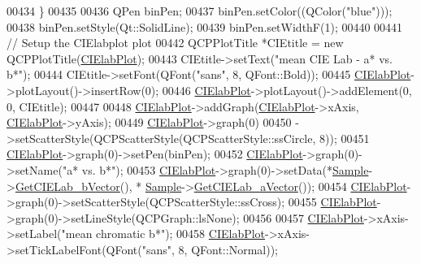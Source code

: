 \begin{DoxyCode}
{{00434     \}
00435 
00436   QPen binPen;
00437   binPen.setColor((QColor(\textcolor{stringliteral}{"blue"})));
00438   binPen.setStyle(Qt::SolidLine);
00439   binPen.setWidthF(1);
00440 
00441   \textcolor{comment}{// Setup the CIElabplot plot}
00442   QCPPlotTitle *CIEtitle = \textcolor{keyword}{new} QCPPlotTitle(\hyperlink{class_q_report_generator_a1a727308ea8cb98523a308d10da70b39}{CIElabPlot});
00443   CIEtitle->setText(\textcolor{stringliteral}{"mean CIE Lab - a* vs. b*"});
00444   CIEtitle->setFont(QFont(\textcolor{stringliteral}{"sans"}, 8, QFont::Bold));
00445   \hyperlink{class_q_report_generator_a1a727308ea8cb98523a308d10da70b39}{CIElabPlot}->plotLayout()->insertRow(0);
00446   \hyperlink{class_q_report_generator_a1a727308ea8cb98523a308d10da70b39}{CIElabPlot}->plotLayout()->addElement(0, 0, CIEtitle);
00447 
00448   \hyperlink{class_q_report_generator_a1a727308ea8cb98523a308d10da70b39}{CIElabPlot}->addGraph(\hyperlink{class_q_report_generator_a1a727308ea8cb98523a308d10da70b39}{CIElabPlot}->xAxis, \hyperlink{class_q_report_generator_a1a727308ea8cb98523a308d10da70b39}{CIElabPlot}->yAxis);
00449   \hyperlink{class_q_report_generator_a1a727308ea8cb98523a308d10da70b39}{CIElabPlot}->graph(0)
00450       ->setScatterStyle(QCPScatterStyle(QCPScatterStyle::ssCircle, 8));
00451   \hyperlink{class_q_report_generator_a1a727308ea8cb98523a308d10da70b39}{CIElabPlot}->graph(0)->setPen(binPen);
00452   \hyperlink{class_q_report_generator_a1a727308ea8cb98523a308d10da70b39}{CIElabPlot}->graph(0)->setName(\textcolor{stringliteral}{"a* vs. b*"});
00453   \hyperlink{class_q_report_generator_a1a727308ea8cb98523a308d10da70b39}{CIElabPlot}->graph(0)->setData(*\hyperlink{class_q_report_generator_a779d8c539bb762daccaf61189cedcae5}{Sample}->\hyperlink{class_soil_analyzer_1_1_sample_adee51a3ce8bafdab4188721736b7761a}{GetCIELab\_bVector}(), *
      \hyperlink{class_q_report_generator_a779d8c539bb762daccaf61189cedcae5}{Sample}->\hyperlink{class_soil_analyzer_1_1_sample_a3e33c17769503a88ccca6fb5fba05e55}{GetCIELab\_aVector}());
00454   \hyperlink{class_q_report_generator_a1a727308ea8cb98523a308d10da70b39}{CIElabPlot}->graph(0)->setScatterStyle(QCPScatterStyle::ssCross);
00455   \hyperlink{class_q_report_generator_a1a727308ea8cb98523a308d10da70b39}{CIElabPlot}->graph(0)->setLineStyle(QCPGraph::lsNone);
00456 
00457   \hyperlink{class_q_report_generator_a1a727308ea8cb98523a308d10da70b39}{CIElabPlot}->xAxis->setLabel(\textcolor{stringliteral}{"mean chromatic b*"});
00458   \hyperlink{class_q_report_generator_a1a727308ea8cb98523a308d10da70b39}{CIElabPlot}->xAxis->setTickLabelFont(QFont(\textcolor{stringliteral}{"sans"}, 8, QFont::Normal));
}}
\end{DoxyCode}
